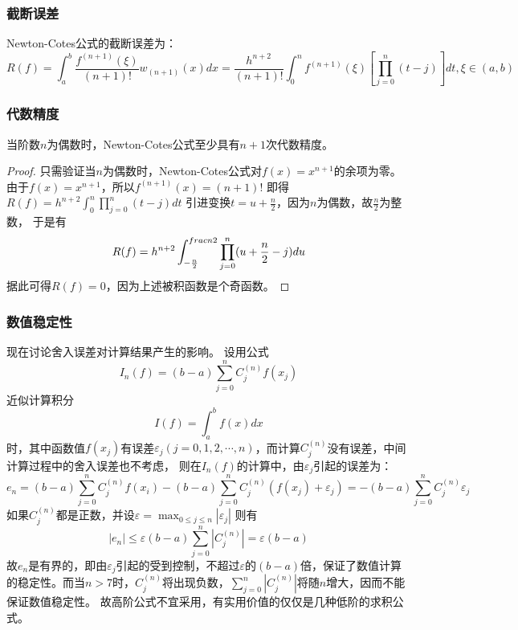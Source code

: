 \subsubsection{截断误差}
Newton-Cotes公式的截断误差为：
\begin{equation*}
    R(f) = \int_{a}^{b}\frac{f^{(n+1)}(\xi)}{(n+1)!}w_{(n+1)}(x)dx = \frac{h^{n+2}}{(n+1)!}\int_{0}^{n}f^{(n+1)}(\xi)[\prod_{j=0}^{n}(t-j)]dt,\xi \in (a,b)
\end{equation*}

\subsubsection{代数精度}
\begin{theorem}
    当阶数$n$为偶数时，Newton-Cotes公式至少具有$n+1$次代数精度。
\end{theorem}

\begin{proof}
    只需验证当$n$为偶数时，Newton-Cotes公式对$f(x) = x^{n+1}$的余项为零。
    由于$f(x) = x^{n+1}$，所以$f^{(n+1)}(x) = (n+1)!$ 
    即得$R(f) = h^{n+2}\int_{0}^{n}\prod_{j=0}^{n}(t-j)dt$
    引进变换$t = u+\frac{n}{2}$，因为$n$为偶数，故$\frac{n}{2}$为整数，
    于是有
    \begin{equation*}
        R(f) = h^{n+2}\int_{-\frac{n}{2}}^{\\frac{n}{2}}\prod_{j=0}^{n}(u+\frac{n}{2}-j)du
    \end{equation*}
    据此可得$R(f)=0$，因为上述被积函数是个奇函数。
\end{proof}

\subsubsection{数值稳定性}

现在讨论舍入误差对计算结果产生的影响。
设用公式
\begin{equation*}
    I_n(f) = (b-a)\sum_{j=0}^{n}C_j^{(n)}f(x_j)
\end{equation*}
近似计算积分
\begin{equation*}
    I(f) = \int_{a}^{b}f(x)dx
\end{equation*}
时，其中函数值$f(x_j)$有误差$\varepsilon_j(j = 0,1,2,\cdots,n)$，而计算$C_j^{(n)}$没有误差，中间计算过程中的舍入误差也不考虑，
则在$I_n(f)$的计算中，由$\varepsilon_j$引起的误差为：
\begin{equation*}
    e_n = (b-a)\sum_{j=0}^{n}C_j^{(n)}f(x_i)-(b-a)\sum_{j=0}^{n}C_j^{(n)}(f(x_j)+\varepsilon_j) =-(b-a)\sum_{j=0}^{n}C_j^{(n)}\varepsilon_j
\end{equation*}
如果$C_j^{(n)}$都是正数，并设$\varepsilon = \max_{0\leq j\leq n}|\varepsilon_j|$
则有
\begin{equation*}
    |e_n|\leq \varepsilon(b-a)\sum_{j=0}^{n}|C_j^{(n)}| = \varepsilon(b-a)
\end{equation*}
故$e_n$是有界的，即由$\varepsilon_j$引起的受到控制，不超过$\varepsilon$的$(b-a)$倍，保证了数值计算的稳定性。而当$n>7$时，$C_j^{(n)}$将出现负数，$\sum_{j=0}^{n}|C_j^{(n)}|$将随$n$增大，因而不能保证数值稳定性。
故高阶公式不宜采用，有实用价值的仅仅是几种低阶的求积公式。

